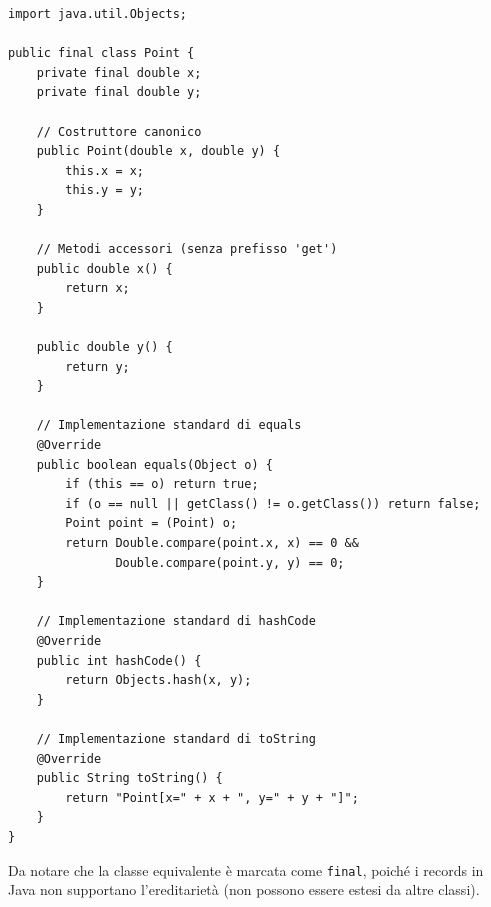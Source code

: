 \begin{lstlisting}[caption={Classe Java equivalente al Record Point}]
import java.util.Objects;

public final class Point {
    private final double x;
    private final double y;

    // Costruttore canonico
    public Point(double x, double y) {
        this.x = x;
        this.y = y;
    }

    // Metodi accessori (senza prefisso 'get')
    public double x() {
        return x;
    }

    public double y() {
        return y;
    }

    // Implementazione standard di equals
    @Override
    public boolean equals(Object o) {
        if (this == o) return true;
        if (o == null || getClass() != o.getClass()) return false;
        Point point = (Point) o;
        return Double.compare(point.x, x) == 0 &&
               Double.compare(point.y, y) == 0;
    }

    // Implementazione standard di hashCode
    @Override
    public int hashCode() {
        return Objects.hash(x, y);
    }

    // Implementazione standard di toString
    @Override
    public String toString() {
        return "Point[x=" + x + ", y=" + y + "]";
    }
}
\end{lstlisting}

Da notare che la classe equivalente è marcata come \texttt{final}, poiché i records in Java non supportano l'ereditarietà (non possono essere estesi da altre classi).


